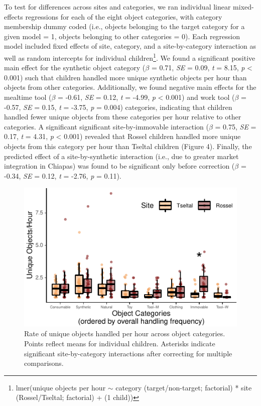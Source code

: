 \documentclass[10pt, letterpaper]{article}
\newenvironment{CodeChunk}{}{}
\begin{document}
To test for differences across sites and categories, we ran individual
linear mixed-effects regressions for each of the eight object
categories, with category membership dummy coded (i.e., objects
belonging to the target category for a given model = 1, objects
belonging to other categories = 0). Each regression model included fixed
effects of site, category, and a site-by-category interaction as well as
random intercepts for individual children\footnote{lmer(unique objects
  per hour \({\sim}\) category (target/non-target; factorial) * site
  (Rossel/Tseltal; factorial) + (1 \textbar{} child))}. We found a
significant positive main effect for the synthetic object category
(\(\beta\) = 0.71, \emph{SE} = 0.09, \emph{t} = 8.15, \emph{p}
\textless{} 0.001) such that children handled more unique synthetic
objects per hour than objects from other categories. Additionally, we
found negative main effects for the mealtime tool (\(\beta\) = -0.61,
\emph{SE} = 0.12, \emph{t} = -4.99, \emph{p} \textless{} 0.001) and work
tool (\(\beta\) = -0.57, \emph{SE} = 0.15, \emph{t} = -3.75, \emph{p} =
0.004) categories, indicating that children handled fewer unique objects
from these categories per hour relative to other categories. A
significant significant site-by-immovable interaction (\(\beta\) = 0.75,
\emph{SE} = 0.17, \emph{t} = 4.31, \emph{p} \textless{} 0.001) revealed
that Rossel children handled more unique objects from this category per
hour than Tseltal children (Figure 4). Finally, the predicted effect of
a site-by-synthetic interaction (i.e., due to greater market integration
in Chiapas) was found to be significant only before correction
(\(\beta\) = -0.34, \emph{SE} = 0.12, \emph{t} = -2.76, \emph{p} =
0.11).

\begin{CodeChunk}
\begin{figure}[!h]

\includegraphics{figs/overall-stats-fig-1} \hfill{}

\caption[Rate of unique objects handled per hour across object categories]{Rate of unique objects handled per hour across object categories. Points reflect means for individual children. Asterisks indicate significant site-by-category interactions after correcting for multiple comparisons.}\label{fig:overall-stats-fig}
\end{figure}
\end{CodeChunk}
\end{document}
